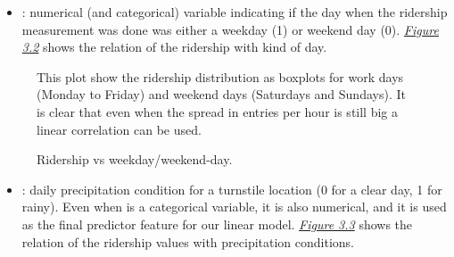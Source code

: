 \documentclass[a4paper,12pt,english]{sphinxmanual}
\begin{document}
\begin{itemize}
\item {} 
: numerical (and categorical) variable indicating if the day when the
ridership measurement was done was either a weekday (1) or weekend day (0).
{\hyperref[section2:figure32]{\emph{Figure 3.2}}} shows the relation of the ridership with kind of
day.

\end{itemize}
\begin{figure}[htbp]
\centering
\capstart

\caption{Ridership vs weekday/weekend-day.}{\small 
This plot show the ridership distribution as boxplots for work days (Monday
to Friday) and weekend days (Saturdays and Sundays). It is clear that even
when the spread in entries per hour is still big a linear correlation can
be used.
}\label{section2:figure32}\end{figure}
\begin{itemize}
\item {} 
: daily precipitation condition for a turnstile location (0 for a clear
day, 1 for rainy). Even when is a categorical variable, it is also numerical,
and it is used as the final predictor feature for our linear model.
{\hyperref[section2:figure33]{\emph{Figure 3.3}}} shows the relation of the ridership values with
precipitation conditions.

\end{itemize}
\end{document}
